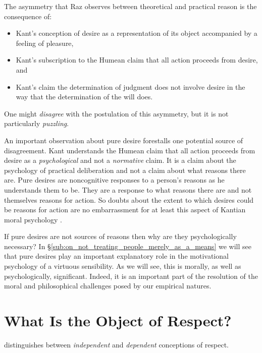 \documentclass[12pt]{article}
\begin{document}
The asymmetry that Raz observes between theoretical and practical reason is the consequence of: 
\begin{itemize}
	\item Kant's conception of desire as a representation of its object accompanied by a feeling of pleasure, 
	\item Kant's subscription to the Humean claim that all action proceeds from desire, and 
	\item Kant's claim the determination of judgment does not involve desire in the way that the determination of the will does. 
\end{itemize}
One might \emph{disagree} with the postulation of this asymmetry, but it is not particularly \emph{puzzling}.

An important observation about pure desire forestalls one potential source of disagreement. Kant understands the Humean claim that all action proceeds from desire as a \emph{psychological} and not a \emph{normative} claim. It is a claim about the psychology of practical deliberation and not a claim about what reasons there are. Pure desires are noncognitive responses to a person's reasons as he understands them to be. They are a response to what reasons there are and not themselves reasons for action. So doubts about the extent to which desires could be reasons for action are no embarrassment for at least this aspect of Kantian moral psychology \citep[for such doubts see, inter alia,][]{Scanlon:1998hb, Raz:2000tm}. 

If pure desires are not sources of reasons then why are they psychologically necessary? In \S\ref{sub:on_not_treating_people_merely_as_a_means} we will see that pure desires play an important explanatory role in the motivational psychology of a virtuous sensibility. As we will see, this is morally, as well as psychologically, significant. Indeed, it is an important part of the resolution of the moral and philosophical challenges posed by our empirical natures.


\section{What Is the Object of Respect?} \label{sec:what_is_the_object_of_respect} %

\citet{Raz:2001ps,Raz:2002vn} distinguishes between \emph{independent} and \emph{dependent} conceptions of respect. 
\end{document}

